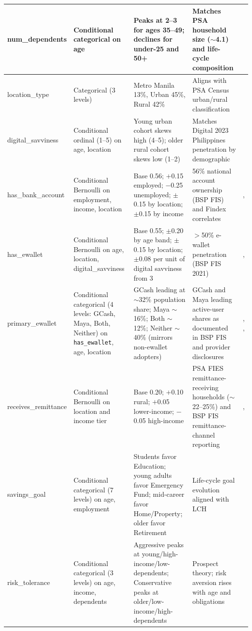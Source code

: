 \documentclass[journal]{./IEEE/IEEEtran}
\begin{document}
\begin{table}[t]
\begin{tabular}{|l|p{2.8cm}|p{3.6cm}|p{5.0cm}|c|}
        \hline
        num\_dependents & Conditional categorical on age & Peaks at 2--3 for ages 35--49; declines for under-25 and 50+ & Matches PSA household size ($\sim$4.1) and life-cycle composition & \cite{ref39} \\
        \hline
        location\_type & Categorical (3 levels) & Metro Manila 13\%, Urban 45\%, Rural 42\% & Aligns with PSA Census urban/rural classification & \cite{ref39} \\
        \hline
        digital\_savviness & Conditional ordinal (1--5) on age, location & Young urban cohort skews high (4--5); older rural cohort skews low (1--2) & Matches Digital 2023 Philippines penetration by demographic & \cite{ref42} \\
        \hline
        has\_bank\_account & Conditional Bernoulli on employment, income, location & Base 0.56; $+$0.15 employed; $-$0.25 unemployed; $\pm$0.15 by location; $\pm$0.15 by income & 56\% national account ownership (BSP FIS) and Findex correlates & \cite{ref35}, \cite{ref66} \\
        \hline
        has\_ewallet & Conditional Bernoulli on age, location, digital\_savviness & Base 0.55; $\pm$0.20 by age band; $\pm$0.15 by location; $\pm 0.08$ per unit of digital savviness from 3 & $>$50\% e-wallet penetration (BSP FIS 2021) & \cite{ref35}, \cite{ref42} \\
        \hline
        primary\_ewallet & Conditional categorical (4 levels: GCash, Maya, Both, Neither) on \texttt{has\_ewallet}, age, location & GCash leading at $\sim$32\% population share; Maya $\sim$16\%; Both $\sim$12\%; Neither $\sim$40\% (mirrors non-ewallet adopters) & GCash and Maya leading active-user shares as documented in BSP FIS and provider disclosures & \cite{ref9}, \cite{ref35}, \cite{ref42} \\
        \hline
        receives\_remittance & Conditional Bernoulli on location and income tier & Base 0.20; $+$0.10 rural; $+$0.05 lower-income; $-$0.05 high-income & PSA FIES remittance-receiving households ($\sim$22--25\%) and BSP FIS remittance-channel reporting & \cite{ref35}, \cite{ref40} \\
        \hline
        savings\_goal & Conditional categorical (7 levels) on age, employment & Students favor Education; young adults favor Emergency Fund; mid-career favor Home/Property; older favor Retirement & Life-cycle goal evolution aligned with LCH & \cite{ref65} \\
        \hline
        risk\_tolerance & Conditional categorical (3 levels) on age, income, dependents & Aggressive peaks at young/high-income/low-dependents; Conservative peaks at older/low-income/high-dependents & Prospect theory; risk aversion rises with age and obligations & \cite{ref62} \\

\end{tabular}
\end{table}
\end{document}
